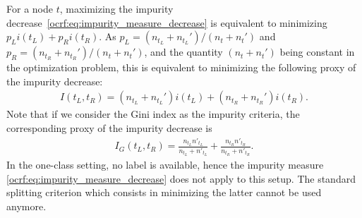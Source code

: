 For a node $t$, maximizing the impurity decrease~\eqref{ocrf:eq:impurity_measure_decrease}
is equivalent to minimizing $p_L i(t_L) + p_R i(t_R)$.
As $p_L = (n_{t_L} + n_{t_L}') / (n_t + n_t')$ and $p_R = (n_{t_R} + n_{t_R}')/(n_t + n_t')$, and the quantity $(n_t + n_t')$ being constant in the optimization problem, this
 is equivalent to minimizing the following proxy of the impurity decrease:
\begin{align}
\label{ocrf:eq:two_class_proxy}
I(t_L, t_R) =   (n_{t_L} + n_{t_L}') i(t_L) + (n_{t_R} + n_{t_R}') i(t_R).
\end{align}
Note that if we consider the Gini index as the impurity criteria, the corresponding proxy of the impurity decrease is
\begin{align}
\label{ocrf:tc_proxy}
I_G(t_L, t_R)= \frac{n_{t_L} n'_{t_L}}{n_{t_L} +  n'_{t_L}} + \frac{n_{t_R} n'_{t_R}}{n_{t_R} +  n'_{t_R}}.
\end{align}
%
In the one-class setting, no label is available, hence the impurity measure \eqref{ocrf:eq:impurity_measure_decrease} does not apply to this setup. The standard splitting criterion which consists in minimizing the latter cannot be used anymore.





